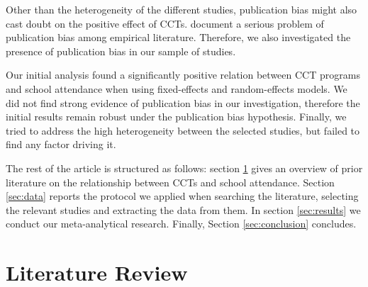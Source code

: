 \documentclass[a4paper, 10pt]{article}
\begin{document}
Other than the heterogeneity of the different studies, publication bias might also cast doubt on the positive effect of CCTs. \cite{brodeur2018methods} document a serious problem of publication bias among empirical literature. Therefore, we also investigated the presence of publication bias in our sample of studies. 

Our initial analysis found a significantly positive relation between CCT programs and school attendance when using fixed-effects and random-effects models. We did not find strong evidence of publication bias in our investigation, therefore the initial results remain robust under the publication bias hypothesis. Finally, we tried to address the high heterogeneity between the selected studies, but failed to find any factor driving it.

The rest of the article is structured as follows: section \ref{sec:evidence} gives an overview of prior literature on the relationship between CCTs and school attendance. Section \ref{sec:data} reports the protocol we applied when searching the literature, selecting the relevant studies and extracting the data from them. In section \ref{sec:results} we conduct our meta-analytical research. Finally, Section \ref{sec:conclusion} concludes.


\section{Literature Review} \label{sec:evidence}
\end{document}
